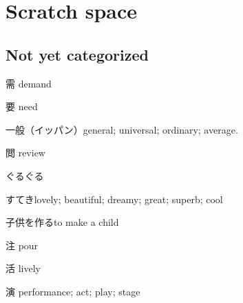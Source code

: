 \chapter{Scratch space}

\section{Not yet categorized}

需 demand

要 need

一般（イッパン）general; universal; ordinary; average.

閲 review

ぐるぐる

すてきlovely; beautiful; dreamy; great; superb; cool


子供を作るto make a child

注 pour

活 lively

演 performance; act; play; stage

